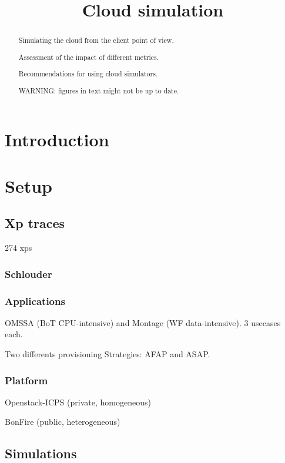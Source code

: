 \documentclass[a4paper,10pt]{article}
\title{Cloud simulation}
\author{}
\begin{document}
\maketitle

\begin{abstract}

Simulating the cloud from the client point of view.

Assessment of the impact of different metrics.

Recommendations for using cloud simulators.

WARNING: figures in text might not be up to date.

\end{abstract}

\section{Introduction}



\section{Setup}


\subsection{Xp traces}

274 xps

\subsubsection{Schlouder}


\subsubsection{Applications}

OMSSA (BoT CPU-intensive) and Montage (WF data-intensive). 3 usecases each.

Two differents provisioning Strategies: AFAP and ASAP.

\subsubsection{Platform}

Openstack-ICPS (private, homogeneous) 

BonFire (public, heterogeneous)


\subsection{Simulations}
\end{document}
